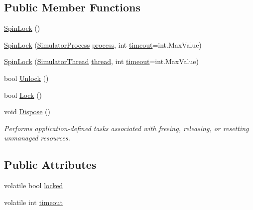\subsection*{Public Member Functions}
\begin{DoxyCompactItemize}
\item 
\hyperlink{class_c_p_u___o_s___simulator_1_1_operating___system_1_1_threading_1_1_spin_lock_a894d22445c71ff22fa722077a44dc1ae}{Spin\+Lock} ()
\item 
\hyperlink{class_c_p_u___o_s___simulator_1_1_operating___system_1_1_threading_1_1_spin_lock_aa4be46128c6cbe4b9c4570397cf18a10}{Spin\+Lock} (\hyperlink{class_c_p_u___o_s___simulator_1_1_operating___system_1_1_simulator_process}{Simulator\+Process} \hyperlink{class_c_p_u___o_s___simulator_1_1_operating___system_1_1_threading_1_1_spin_lock_a1b176f42008264daf38e29347e36ab49}{process}, int \hyperlink{class_c_p_u___o_s___simulator_1_1_operating___system_1_1_threading_1_1_spin_lock_a253ad9e4ccade1d7c530d388fcc5127b}{timeout}=int.\+Max\+Value)
\item 
\hyperlink{class_c_p_u___o_s___simulator_1_1_operating___system_1_1_threading_1_1_spin_lock_a3c836f7b2bbf46e1d0d24a76476f9fa2}{Spin\+Lock} (\hyperlink{class_c_p_u___o_s___simulator_1_1_operating___system_1_1_threading_1_1_simulator_thread}{Simulator\+Thread} \hyperlink{class_c_p_u___o_s___simulator_1_1_operating___system_1_1_threading_1_1_spin_lock_a185fc2c9d71f3aa1ae04e4efd131f509}{thread}, int \hyperlink{class_c_p_u___o_s___simulator_1_1_operating___system_1_1_threading_1_1_spin_lock_a253ad9e4ccade1d7c530d388fcc5127b}{timeout}=int.\+Max\+Value)
\item 
bool \hyperlink{class_c_p_u___o_s___simulator_1_1_operating___system_1_1_threading_1_1_spin_lock_a52d98230d9ed80e51a098260c63d481a}{Unlock} ()
\item 
bool \hyperlink{class_c_p_u___o_s___simulator_1_1_operating___system_1_1_threading_1_1_spin_lock_ad328ae47673faa145eaa956306f88543}{Lock} ()
\item 
void \hyperlink{class_c_p_u___o_s___simulator_1_1_operating___system_1_1_threading_1_1_spin_lock_a6735c7b707333909558a68a96c94bf02}{Dispose} ()
\begin{DoxyCompactList}\small\item\em Performs application-\/defined tasks associated with freeing, releasing, or resetting unmanaged resources. \end{DoxyCompactList}\end{DoxyCompactItemize}
\subsection*{Public Attributes}
\begin{DoxyCompactItemize}
\item 
volatile bool \hyperlink{class_c_p_u___o_s___simulator_1_1_operating___system_1_1_threading_1_1_spin_lock_a5add3b666329920817d380f5fb27abbb}{locked}
\item 
volatile int \hyperlink{class_c_p_u___o_s___simulator_1_1_operating___system_1_1_threading_1_1_spin_lock_a253ad9e4ccade1d7c530d388fcc5127b}{timeout}
\end{DoxyCompactItemize}
